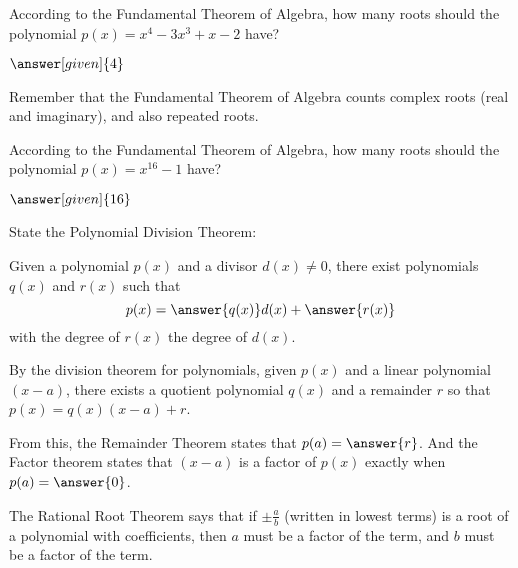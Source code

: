 \documentclass[nooutcomes]{ximera}
\begin{document}
\begin{problem}
According to the Fundamental Theorem of Algebra, how many roots should the polynomial $p(x) = x^4 - 3x^3 + x - 2$ have?
\begin{prompt}
	$\answer[given]{4}$
\end{prompt}
\begin{hint}
	Remember that the Fundamental Theorem of Algebra counts complex roots (real and imaginary), and also repeated roots.
\end{hint}
\end{problem}



\begin{problem}
According to the Fundamental Theorem of Algebra, how many roots should the polynomial $p(x) = x^{16} - 1$ have?
\begin{prompt}
	$\answer[given]{16}$
\end{prompt}
\end{problem}

\begin{problem}
State the Polynomial Division Theorem: 

Given a polynomial $p(x)$ and a divisor $d(x)\ne 0$, there exist polynomials $q(x)$ and $r(x)$ such that 
\[
p(x) = \answer{q(x)}d(x)+\answer{r(x)}
\]
with the degree of $r(x)$ 
\wordChoice{\choice{$=$} \choice[correct]{$<$} \choice{$\le$} \choice{$\ne$} \choice{$>$}}
the degree of $d(x)$. 
\end{problem}

\begin{problem}
By the division theorem for polynomials, given $p(x)$ and a linear polynomial $(x-a)$, there exists a quotient polynomial $q(x)$ and a remainder $r$ so that $p(x)= q(x)(x-a) + r$.  

From this, the Remainder Theorem states that $p(a)=\answer{r}$.  And the Factor theorem states that $(x-a)$ is a factor of $p(x)$ exactly when $p(a)=\answer{0}$.
\end{problem}

\begin{problem}
The Rational Root Theorem says that if $\pm \frac{a}{b}$ (written in lowest terms) is a root of a polynomial with 
coefficients, then $a$ must be a factor of the 
 term, and $b$ must be a factor of the 
term.
\end{problem}
\end{document}
